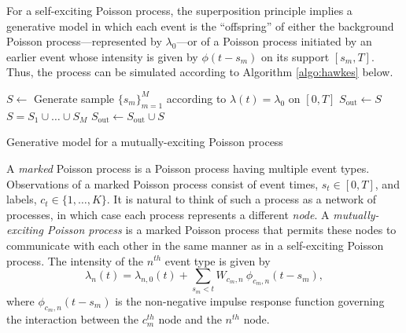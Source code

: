 		For a self-exciting Poisson process, the superposition principle implies a generative model in which each event is the ``offspring'' of either the background Poisson process---represented by $\lambda_0$---or of a Poisson process initiated by an earlier event whose intensity is given by $\phi(t-s_m)$ on its support $[s_m, T]$. Thus, the process can be simulated according to Algorithm \ref{algo:hawkes} below.

		\begin{algorithm}
				\begin{algorithmic}
					\vspace{1mm}
					\STATE $S \gets$ Generate sample $\{s_m\}_{m=1}^M$ according to $\lambda(t) = \lambda_0$ on $[0, T]$
					\STATE $S_{\text{out}} \gets S$
					\REPEAT
						\ENDFOR
					\STATE $S = S_1 \cup \dots \cup S_M$
					\STATE $S_{\text{out}} \gets S_{\text{out}} \cup S$
			\end{algorithmic}
			\caption{Generative model for a mutually-exciting Poisson process}
			\label{algo:hawkes}
		\end{algorithm}

		A \textit{marked} Poisson process is a Poisson process having multiple event types. Observations of a marked Poisson process consist of event times, $s_t \in [0, T]$, and labels, $c_t \in \{1, \dots, K\}$. It is natural to think of such a process as a network of processes, in which case each process represents a different \textit{node}. A \textit{mutually-exciting Poisson process} is a marked Poisson process that permits these nodes to communicate with each other in the same manner as in a self-exciting Poisson process. The intensity of the $n^{th}$ event type is given by
		\begin{equation} \label{eq:hawkes-intensity}
			\lambda_{n}(t) = \lambda_{n, 0}(t) + \sum_{s_m < t} W_{c_m, n} \ \phi_{c_m, n}(t-s_m),
		\end{equation}
		where $\phi_{c_m, n}(t-s_m)$ is the non-negative impulse response function governing the interaction between the $c_m^{th}$ node and the $n^{th}$ node.

